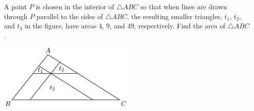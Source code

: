 A point $P$ is chosen in the interior of $\triangle ABC$ so that when lines are drawn through $P$ parallel to the sides of $\triangle ABC$, the resulting smaller triangles, $t_1$, $t_2$, and $t_3$ in the figure, have areas 4, 9, and 49, respectively. Find the area of $\triangle ABC$.
\begin{center}
\includegraphics[width = 67.0mm]{img/fig0.png}
\end{center}